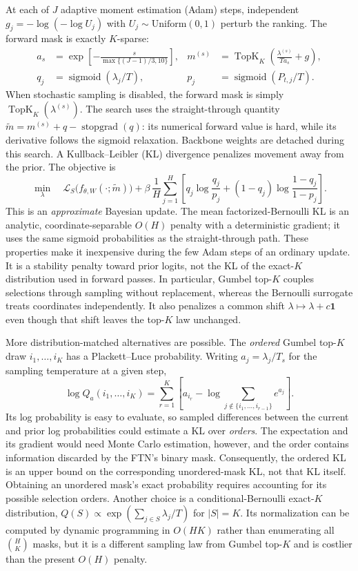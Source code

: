 \documentclass[11pt]{article}
\newcommand{\TopK}{\operatorname{TopK}}
\newcommand{\sig}{\operatorname{sigmoid}}
\newcommand{\loss}{\mathcal{L}}
\begin{document}
At each of $J$ adaptive moment estimation (Adam) steps, independent
$g_j=-\log(-\log U_j)$ with
$U_j\sim\mathrm{Uniform}(0,1)$ perturb the ranking. The forward mask is
exactly $K$-sparse:
\begin{align}
 a_s&=\exp\!\left[-\frac{s}{\max\{(J-1)/3,10\}}\right],
 &m^{(s)}&=\TopK_K\!\left(\frac{\lambda^{(s)}}{T a_s}+g\right),\nonumber\\
 q_j&=\sig(\lambda_j/T),
 &p_j&=\sig(P_{t,j}/T).
 \label{eq:gumbel}
\end{align}
When stochastic sampling is disabled, the forward mask is simply
$\TopK_K(\lambda^{(s)})$. The search uses the straight-through quantity
$\widetilde m=m^{(s)}+q-\operatorname{stopgrad}(q)$: its numerical forward
value is hard, while its derivative follows the sigmoid relaxation. Backbone
weights are detached during this search. A Kullback--Leibler (KL) divergence
penalizes movement away from the prior. The objective is
\begin{equation}
 \min_{\lambda}\quad
 \loss_S\bigl(f_{\theta,W}(\cdot;\widetilde m)\bigr)
 +\beta\,\frac{1}{H}\sum_{j=1}^{H}
 \left[q_j\log\frac{q_j}{p_j}
 +(1-q_j)\log\frac{1-q_j}{1-p_j}\right].
 \label{eq:objective}
\end{equation}
This is an \emph{approximate} Bayesian update. The mean factorized-Bernoulli
KL is an analytic, coordinate-separable $O(H)$ penalty with a deterministic
gradient; it uses the same sigmoid probabilities as the straight-through
path. These properties make it inexpensive during the few Adam steps of an
ordinary update. It is a stability penalty toward prior logits, not the KL
of the exact-$K$ distribution used in forward passes. In particular,
Gumbel top-$K$ couples selections through sampling without replacement,
whereas the Bernoulli surrogate treats coordinates independently. It also
penalizes a common shift $\lambda\mapsto\lambda+c\mathbf{1}$ even though
that shift leaves the top-$K$ law unchanged.

More distribution-matched alternatives are possible. The \emph{ordered}
Gumbel top-$K$ draw $i_1,\ldots,i_K$ has a Plackett--Luce probability.
Writing $a_j=\lambda_j/T_s$ for the sampling temperature at a given step,
\begin{equation}
 \log Q_a(i_1,\ldots,i_K)=\sum_{r=1}^{K}
 \left[a_{i_r}-\log\!\sum_{j\notin\{i_1,\ldots,i_{r-1}\}}e^{a_j}\right].
 \label{eq:pl}
\end{equation}
Its log probability is easy to evaluate, so sampled differences between
the current and prior log probabilities could estimate a KL over \emph{orders}.
The expectation and its gradient would need Monte Carlo estimation, however,
and the order contains information discarded by the FTN's binary mask.
Consequently, the ordered KL is an upper bound on the corresponding
unordered-mask KL, not that KL itself. Obtaining an unordered mask's exact
probability requires accounting for its possible selection orders.
Another choice is a conditional-Bernoulli exact-$K$ distribution,
$Q(S)\propto\exp(\sum_{j\in S}\lambda_j/T)$ for $|S|=K$.
Its normalization can be computed by dynamic programming in $O(HK)$ rather
than enumerating all $\binom{H}{K}$ masks, but it is a different sampling law
from Gumbel top-$K$ and is costlier than the present $O(H)$ penalty.
\end{document}
